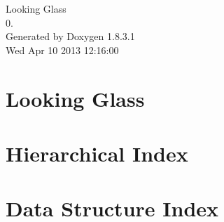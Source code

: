 \documentclass{book}
\begin{document}
\hypersetup{pageanchor=false,citecolor=blue}
\begin{titlepage}
\vspace*{7cm}
\begin{center}
{\Large Looking Glass \\[1ex]\large 0. }\\
\vspace*{1cm}
{\large Generated by Doxygen 1.8.3.1}\\
\vspace*{0.5cm}
{\small Wed Apr 10 2013 12:16:00}\\
\end{center}
\end{titlepage}
\clearemptydoublepage
{}
\tableofcontents
\clearemptydoublepage
{}
\hypersetup{pageanchor=true,citecolor=blue}
\chapter{Looking Glass}
\label{index}\hypertarget{index}{}
\chapter{Hierarchical Index}

\chapter{Data Structure Index}

\end{document}
